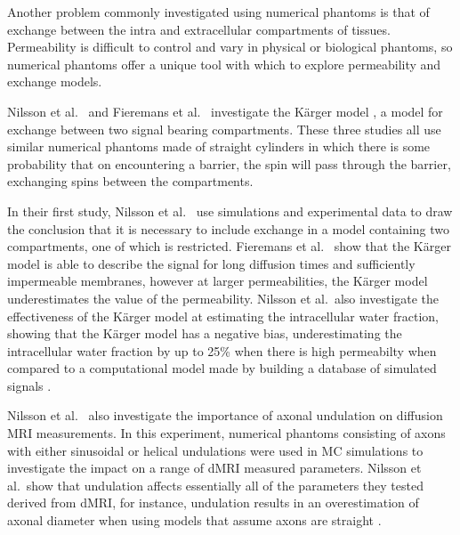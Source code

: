 
Another problem commonly investigated using numerical phantoms is that of exchange between the intra and extracellular compartments of tissues.
Permeability is difficult to control and vary in physical or biological phantoms, so numerical phantoms offer a unique tool with which to explore permeability and exchange models.

Nilsson et al.\ \cite{Nilsson2009, Nilsson2010} and Fieremans et al.\ \cite{Fieremans2010} investigate the K\"arger model \cite{KARGER1988}, a model for exchange between two signal bearing compartments.
These three studies all use similar numerical phantoms made of straight cylinders in which there is some probability that on encountering a barrier, the spin will pass through the barrier, exchanging spins between the compartments.

In their first study, Nilsson et al.\ \cite{Nilsson2009} use simulations and experimental data to draw the conclusion that it is necessary to include exchange in a model containing two compartments, one of which is restricted. 
Fieremans et al.\ \cite{Fieremans2010} show that the K\"arger model is able to describe the signal for long diffusion times and sufficiently impermeable membranes, however at larger permeabilities, the K\"arger model underestimates the value of the permeability.
Nilsson et al.\ also investigate the effectiveness of the K\"arger model at estimating the intracellular water fraction, showing that the K\"arger model has a negative bias, underestimating the intracellular water fraction by up to 25\% when there is high permeabilty when compared to a computational model made by building a database of simulated signals \cite{Nilsson2010}.

Nilsson et al.\ \cite{Nilsson2012} also investigate the importance of axonal undulation on diffusion MRI measurements.
In this experiment, numerical phantoms consisting of axons with either sinusoidal or helical undulations were used in \ac{MC} simulations to investigate the impact on a range of \ac{dMRI} measured parameters.
Nilsson et al.\ show that undulation affects essentially all of the parameters they tested derived from \ac{dMRI}, for instance, undulation results in an overestimation of axonal diameter when using models that assume axons are straight \cite{Nilsson2012}. 

